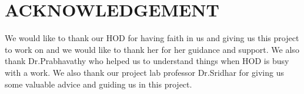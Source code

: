 \chapter*{\uppercase{ACKNOWLEDGEMENT}}
We would like to thank our HOD for having faith in us and giving us this project to work on and we would like to thank her for her guidance and support. We also thank Dr.Prabhavathy who helped us to understand things when HOD is busy with a work. We also thank our project lab professor Dr.Sridhar for giving us some valuable advice and guiding us in this project.